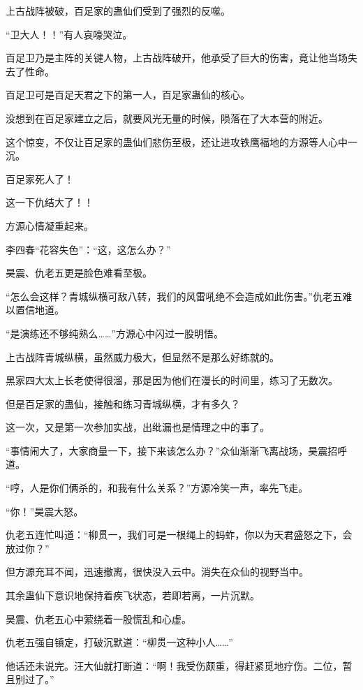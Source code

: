 
\begin{this_body}

上古战阵被破，百足家的蛊仙们受到了强烈的反噬。

“卫大人！！”有人哀嚎哭泣。

百足卫乃是主阵的关键人物，上古战阵破开，他承受了巨大的伤害，竟让他当场失去了性命。

百足卫可是百足天君之下的第一人，百足家蛊仙的核心。

没想到在百足家建立之后，就要风光无量的时候，陨落在了大本营的附近。

这个惊变，不仅让百足家的蛊仙们悲伤至极，还让进攻铁鹰福地的方源等人心中一沉。

百足家死人了！

这一下仇结大了！！

方源心情凝重起来。

李四春“花容失色”：“这，这怎么办？”

昊震、仇老五更是脸色难看至极。

“怎么会这样？青城纵横可敌八转，我们的风雷吼绝不会造成如此伤害。”仇老五难以置信地道。

“是演练还不够纯熟么……”方源心中闪过一股明悟。

上古战阵青城纵横，虽然威力极大，但显然不是那么好练就的。

黑家四大太上长老使得很溜，那是因为他们在漫长的时间里，练习了无数次。

但是百足家的蛊仙，接触和练习青城纵横，才有多久？

这一次，又是第一次参加实战，出纰漏也是情理之中的事了。

“事情闹大了，大家商量一下，接下来该怎么办？”众仙渐渐飞离战场，昊震招呼道。

“哼，人是你们俩杀的，和我有什么关系？”方源冷笑一声，率先飞走。

“你！”昊震大怒。

仇老五连忙叫道：“柳贯一，我们可是一根绳上的蚂蚱，你以为天君盛怒之下，会放过你？”

但方源充耳不闻，迅速撤离，很快没入云中。消失在众仙的视野当中。

其余蛊仙下意识地保持着疾飞状态，若即若离，一片沉默。

昊震、仇老五心中萦绕着一股慌乱和心虚。

仇老五强自镇定，打破沉默道：“柳贯一这种小人……”

他话还未说完。汪大仙就打断道：“啊！我受伤颇重，得赶紧觅地疗伤。二位，暂且别过了。”


\end{this_body}
